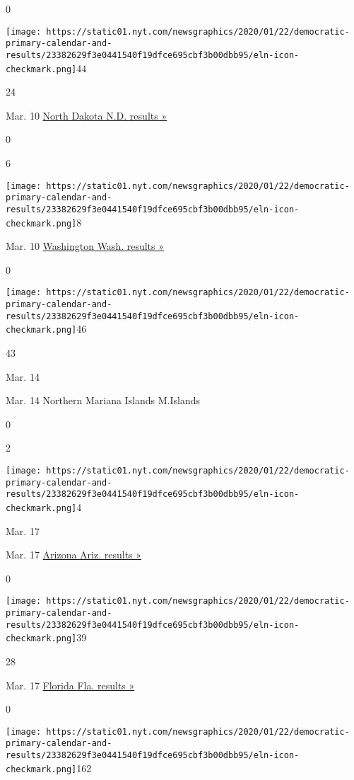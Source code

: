 0

\texttt{[image: https://static01.nyt.com/newsgraphics/2020/01/22/democratic-primary-calendar-and-results/23382629f3e0441540f19dfce695cbf3b00dbb95/eln-icon-checkmark.png]}44

24

Mar. 10
\href{https://www.nytimes.com/interactive/2020/03/10/us/elections/results-north-dakota-president-democrat-caucus-election.html}{North
Dakota N.D. results »}

0

6

\texttt{[image: https://static01.nyt.com/newsgraphics/2020/01/22/democratic-primary-calendar-and-results/23382629f3e0441540f19dfce695cbf3b00dbb95/eln-icon-checkmark.png]}8

Mar. 10
\href{https://www.nytimes.com/interactive/2020/03/10/us/elections/results-washington-president-democrat-primary-election.html}{Washington
Wash. results »}

0

\texttt{[image: https://static01.nyt.com/newsgraphics/2020/01/22/democratic-primary-calendar-and-results/23382629f3e0441540f19dfce695cbf3b00dbb95/eln-icon-checkmark.png]}46

43

Mar. 14

Mar. 14 Northern Mariana Islands M.Islands

0

2

\texttt{[image: https://static01.nyt.com/newsgraphics/2020/01/22/democratic-primary-calendar-and-results/23382629f3e0441540f19dfce695cbf3b00dbb95/eln-icon-checkmark.png]}4

Mar. 17

Mar. 17
\href{https://www.nytimes.com/interactive/2020/03/17/us/elections/results-arizona-president-democrat-primary-election.html}{Arizona
Ariz. results »}

0

\texttt{[image: https://static01.nyt.com/newsgraphics/2020/01/22/democratic-primary-calendar-and-results/23382629f3e0441540f19dfce695cbf3b00dbb95/eln-icon-checkmark.png]}39

28

Mar. 17
\href{https://www.nytimes.com/interactive/2020/03/17/us/elections/results-florida-president-democrat-primary-election.html}{Florida
Fla. results »}

0

\texttt{[image: https://static01.nyt.com/newsgraphics/2020/01/22/democratic-primary-calendar-and-results/23382629f3e0441540f19dfce695cbf3b00dbb95/eln-icon-checkmark.png]}162

